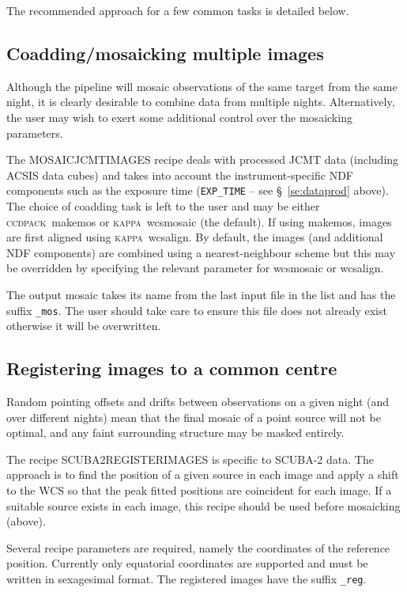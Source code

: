 \documentclass[twoside,11pt]{article}
\renewcommand{\_}{\texttt{\symbol{95}}}
\newcommand{\CCDPACK}{\textsc{ccdpack}}
\newcommand{\KAPPA}{\textsc{kappa}}
\newcommand{\task}[1]{\textsf{#1}}
\begin{document}
The recommended approach for a few common tasks is detailed below.

\subsection{Coadding/mosaicking multiple images}

Although the pipeline will mosaic observations of the same target from
the same night, it is clearly desirable to combine data from multiple
nights. Alternatively, the user may wish to exert some additional
control over the mosaicking parameters.

The \task{MOSAIC\_JCMT\_IMAGES} recipe deals with processed JCMT data
(including ACSIS data cubes) and takes into account the
instrument-specific NDF components such as the exposure time
(\verb+EXP_TIME+ -- see \S\ \ref{se:dataprod} above). The choice of
coadding task is left to the user and may be either
\CCDPACK\ \task{makemos} or \KAPPA\ \task{wcsmosaic} (the default). If
using \task{makemos}, images are first aligned using
\KAPPA\ \task{wcsalign}. By default, the images (and additional NDF
components) are combined using a nearest-neighbour scheme but this may
be overridden by specifying the relevant parameter for
\task{wcsmosaic} or \task{wcsalign}.

The output mosaic takes its name from the last input file in the list
and has the suffix \verb+_mos+. The user should take care to ensure
this file does not already exist otherwise it will be overwritten.

\subsection{Registering images to a common centre\label{se:reg}}

Random pointing offsets and drifts between observations on a given
night (and over different nights) mean that the final mosaic of a
point source will not be optimal, and any faint surrounding structure
may be masked entirely.

The recipe \task{SCUBA2\_REGISTER\_IMAGES} is specific to SCUBA-2
data. The approach is to find the position of a given source in each
image and apply a shift to the WCS so that the peak fitted positions
are coincident for each image. If a suitable source exists in each
image, this recipe should be used before mosaicking (above).

Several recipe parameters are required, namely the coordinates of the
reference position. Currently only equatorial coordinates are
supported and must be written in sexagesimal format. The registered
images have the suffix \verb+_reg+.
\end{document}
